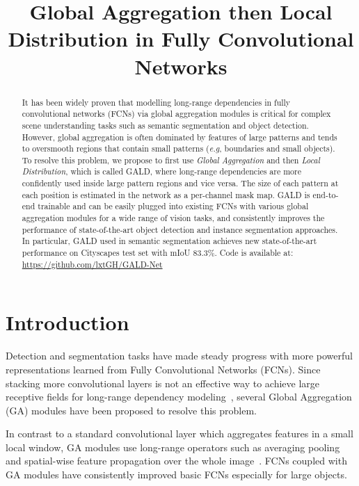 \documentclass{bmvc2k}
\title{Global Aggregation then Local Distribution in Fully Convolutional Networks}
\def\eg{\emph{e.g}\bmvaOneDot}
\begin{document}
\maketitle
\begin{abstract}
\noindent 
It has been widely proven that modelling long-range dependencies in fully convolutional networks (FCNs) via global aggregation modules is critical for complex scene understanding tasks such as semantic segmentation and object detection. However, global aggregation is often dominated by features of large patterns and tends to oversmooth regions that contain small patterns (\eg, boundaries and small objects). 
To resolve this problem, we propose to first use \emph{Global Aggregation} and then \emph{Local Distribution}, which is called GALD, where long-range dependencies are more confidently used inside large pattern regions and vice versa. 
The size of each pattern at each position is estimated in the network as a per-channel mask map. 
GALD is end-to-end trainable and can be easily plugged into existing FCNs with various global aggregation modules for a wide range of vision tasks, and consistently improves the performance of state-of-the-art object detection and instance segmentation approaches. In particular, GALD used in semantic segmentation achieves new state-of-the-art performance on Cityscapes test set with mIoU 83.3\%. 
Code is available at: \url{https://github.com/lxtGH/GALD-Net}

\end{abstract}

\section{Introduction}
Detection and segmentation tasks have made steady progress with more powerful representations learned from Fully Convolutional Networks (FCNs). Since stacking more convolutional layers is not an effective way to achieve large receptive fields for long-range dependency modeling~\cite{zhou2014object,luo2016understanding}, several Global Aggregation (GA) modules have  been proposed to resolve this problem.

In contrast to a standard convolutional layer which aggregates features in a small local window, GA modules use long-range operators such as averaging pooling~\cite{pspnet, deeplabv3} and spatial-wise feature propagation over the whole image~\cite{Nonlocal,ocnet,DAnet}. FCNs coupled with GA modules have consistently improved basic FCNs especially for large objects. 
\end{document}
